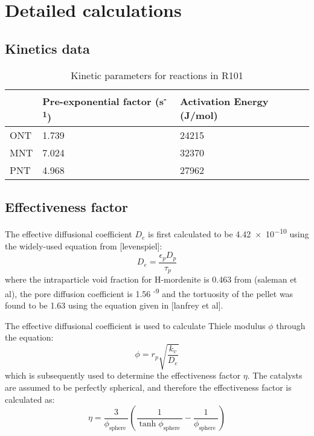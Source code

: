 \section{Detailed calculations}
\label{app:reaction}
\subsection{Kinetics data}

\begin{table}[h]
\centering
\caption{Kinetic parameters for reactions in R101}
\label{tab:R1-kinetic-params}
\begin{tabular}{@{}lll@{}}
\toprule
 & Pre-exponential factor (s\textsuperscript{-1}) & Activation Energy (J/mol) \\ \midrule
ONT & 1.739 & 24215 \\
MNT & 7.024 & 32370 \\
PNT & 4.968 & 27962 \\ \bottomrule
\end{tabular}
\end{table}

\subsection{Effectiveness factor}
\label{app:efffactor}
The effective diffusional coefficient $D_e$ is first calculated to be \num{4.42e-10} using the widely-used equation from [levenspiel]: 
\begin{equation}
    D_e = \frac{\epsilon_p D_p}{\tau_p}
\end{equation}
where the intraparticle void fraction for H-mordenite is 0.463 from (saleman et al), the pore diffusion coefficient is 1.56 \textsuperscript{-9} and the tortuosity of the pellet was found to be 1.63 using the equation given in [lanfrey et al]. 

The effective diffusional coefficient is used to calculate Thiele modulus $\phi$ through the equation:
\begin{equation}
    \phi = r_p \sqrt{\frac{k_v}{D_e}}
\end{equation}
which is subsequently used to determine the effectiveness factor $\eta$. The catalysts are assumed to be perfectly spherical, and therefore the effectiveness factor is calculated as: 
\begin{equation}
\eta=\frac{3}{\phi_{\text {sphere }}}\left(\frac{1}{\tanh \phi_{\text {sphere }}}-\frac{1}{\phi_{\text {sphere }}}\right)
\end{equation}

